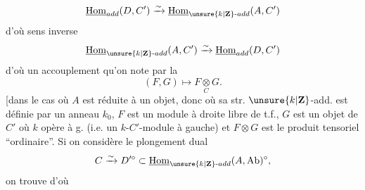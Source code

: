 \[
\underline{\operatorname{Hom}}_{add}(D,C')\xrightarrow{\sim}
\underline{\operatorname{Hom}}_{\unsure{k|\mathbf Z}\text{-}add}(A,C')
\]
d'où  sens inverse
\[
\underline{\operatorname{Hom}}_{\unsure{k|\mathbf Z}\text{-}add}(A,C')\xrightarrow{\sim}
\underline{\operatorname{Hom}}_{add}(D,C')
\]
d'où un accouplement
qu'on note par la
\[
(F,G)\longmapsto F\underset{C}{\otimes}G.
\]
[dans le cas où $A$ est réduite à un
objet, donc où sa str. $\unsure{k|\mathbf Z}$-add. est
définie par un anneau $k_0$,
$F$ est un module à droite libre de
t.f., $G$ est un objet de $C'$ où $k$
opère à g. (i.e. un $k$-$C'$-module
à gauche) et $F\otimes G$ est le
produit tensoriel ``ordinaire''.
Si on considère le plongement
dual
\[
C\xrightarrow{\sim}D'^\circ\subset
\underline{\operatorname{Hom}}_{\unsure{k|\mathbf Z}\text{-}add}(A,\mathrm{Ab})^\circ,
\]
on trouve
d'où
